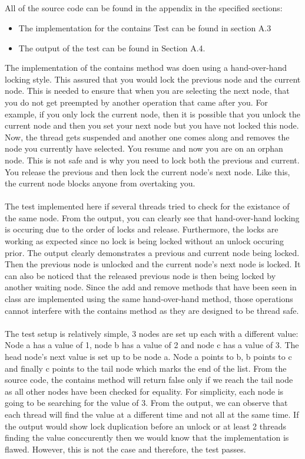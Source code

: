 \documentclass[11pt]{article}
\begin{document}
\subsection{}
All of the source code can be found in the appendix in the specified sections:
\begin{itemize}
	\item The implementation for the contains Test can be found in section A.3
	\item The output of the test can be found in Section A.4.
\end{itemize}

The implementation of the contains method was doen using a hand-over-hand locking style. This assured that you would lock the previous node 
and the current node. This is needed to ensure that when you are selecting the next node, that you do not get preempted by another operation 
that came after you. For example, if you only lock the current node, then it is possible that you unlock the current node and then you set your 
next node but you have not locked this node. Now, the thread gets suspended and another one comes along and removes the node you currently have 
selected. You resume and now you are on an orphan node. This is not safe and is why you need to lock both the previous and current. You release 
the previous and then lock the current node's next node. Like this, the current node blocks anyone from overtaking you.
\\\\
The test implemented here if several threads tried to check for the existance of the same node. From the output, you can clearly see that 
hand-over-hand locking is occuring due to the order of locks and release. Furthermore, the locks are working as expected since no lock 
is being locked without an unlock occuring prior. The output clearly demonstrates a previous and current node being locked. Then the 
previous node is unlocked and the current node's next node is locked. It can also be noticed that the released previous node is then 
being locked by another waiting node. Since the add and remove methods that have been seen in class are implemented using the same 
hand-over-hand method, those operations cannot interfere with the contains method as they are designed to be thread safe.
\\\\
The test setup is relatively simple, 3 nodes are set up each with a different value: Node a has a value of 1, node b has a value of 2
and node c has a value of 3. The head node's next value is set up to be node a. Node a points to b, b points to c and finally c points 
to the tail node which marks the end of the list. From the source code, the contains method will return false only if we reach the tail 
node as all other nodes have been checked for equality. For simplicity, each node is going to be searching for the value of 3. From the 
output, we can observe that each thread will find the value at a different time and not all at the same time. If the output would show 
lock duplication before an unlock or at least 2 threads finding the value conccurently then we would know that the implementation is 
flawed. However, this is not the case and therefore, the test passes. 
\end{document}
